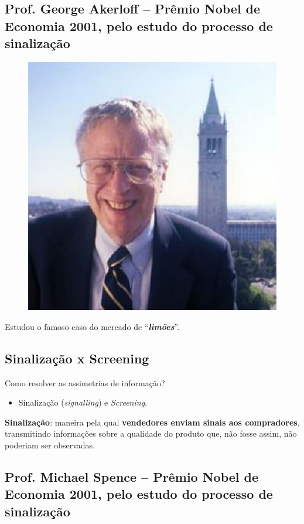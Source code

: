 \documentclass[a4paper,12pt]{article}[abntex2]
\begin{document}
\subsection{\textbf{Prof. George Akerloff – Prêmio Nobel de Economia 2001, pelo estudo do processo de sinalização}}
\begin{figure}[H]
    \centering
    \includegraphics[width=0.7\linewidth]{Imagens/a11i1.png}
\end{figure}

Estudou o famoso caso do mercado de “\textbf{\textit{limões}}”.

\subsection{\textbf{Sinalização x Screening}}
Como resolver as assimetrias de informação?\begin{itemize}
    \item Sinalização (\textit{signalling}) e \textit{Screening}.
\end{itemize}

\textbf{Sinalização}: maneira pela qual \textbf{vendedores enviam sinais aos compradores}, transmitindo informações sobre a qualidade do produto que, não fosse assim, não poderiam ser observadas.

\subsection{\textbf{Prof. Michael Spence – Prêmio Nobel de Economia 2001, pelo estudo do processo de sinalização}}
\end{document}
